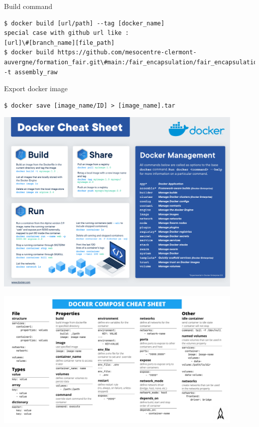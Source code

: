 \begin{frame}[fragile]{Build command}
\begin{verbatim}
$ docker build [url/path] --tag [docker_name]
special case with github url like :
[url]\#[branch_name][file_path]
$ docker build https://github.com/mesocentre-clermont-auvergne/formation_fair.git\#main:/fair_encapsulation/fair_encapsulation_TP/fair_encapsulation_containers/fair_encapsulation_docker/docker_assembly_raw -t assembly_raw
\end{verbatim}
\end{frame}


\begin{frame}[fragile]{Export docker image}
\begin{verbatim}
$ docker save [image_name/ID] > [image_name].tar
\end{verbatim}
\end{frame}

\begin{frame}
\centering\includegraphics[width=0.9\textwidth]{docker-cheat-sheet.pdf}
\end{frame}

\begin{frame}
\centering\includegraphics[width=0.9\textwidth]{docker-compose-cheat-sheet.pdf}
\end{frame}

